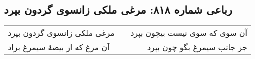 \begin{center}
\section*{رباعی شماره ۸۱۸: مرغی ملکی زانسوی گردون بپرد}
\label{sec:0818}
\begin{longtable}{l p{0.5cm} r}
مرغی ملکی زانسوی گردون بپرد
&&
آن سوی که سوی نیست بیچون بپرد
\\
آن مرغ که از بیضهٔ سیمرغ بزاد
&&
جز جانب سیمرغ بگو چون بپرد
\\
\end{longtable}
\end{center}
